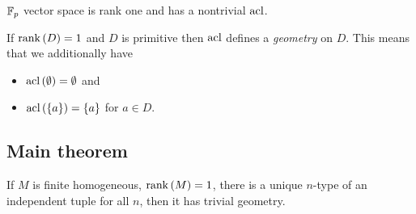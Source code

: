\documentclass{amsart}
\begin{document}
\begin{exm}
$\mathbb{F}_p$ vector space is rank one and has a nontrivial $\operatorname{acl}$.
\end{exm}

If $\operatorname{rank}\left(D\right) = 1$ and $D$ is primitive then $\operatorname{acl}$ defines a \emph{geometry} on
$D$. This means that we additionally have
\begin{itemize}
\item $\operatorname{acl}\left(\emptyset\right)  = \emptyset$ and
\item $\operatorname{acl}\left(\left\{a\right\}\right) = \left\{a\right\}$ for $a\in D$.
\end{itemize}

\subsection{Main theorem}

\begin{thm}
If $M$ is finite homogeneous, $\operatorname{rank}\left(M\right) = 1$, 
there is a unique $n$-type of an independent tuple for all $n$,
then it has trivial geometry.
\end{thm}
\end{document}
